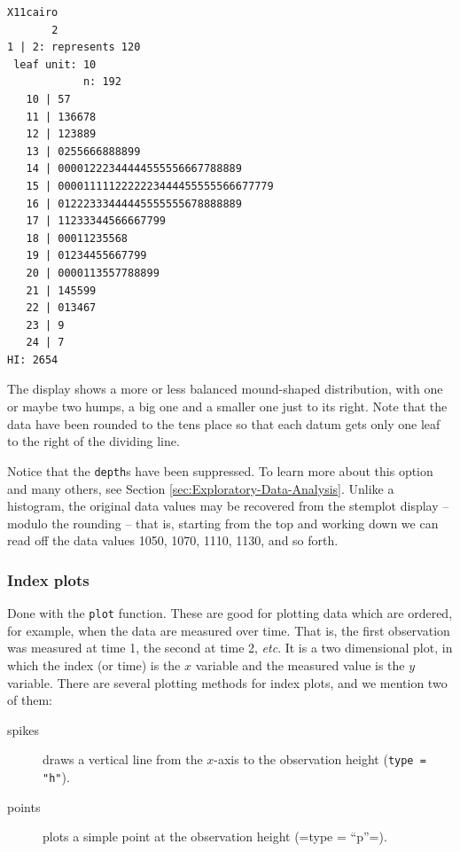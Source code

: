 \documentclass[captions=tableheading]{scrbook}
\begin{document}
\begin{verbatim}
X11cairo 
       2
1 | 2: represents 120
 leaf unit: 10
            n: 192
   10 | 57
   11 | 136678
   12 | 123889
   13 | 0255666888899
   14 | 00001222344444555556667788889
   15 | 0000111112222223444455555566677779
   16 | 01222333444445555555678888889
   17 | 11233344566667799
   18 | 00011235568
   19 | 01234455667799
   20 | 0000113557788899
   21 | 145599
   22 | 013467
   23 | 9
   24 | 7
HI: 2654
\end{verbatim}

The display shows a more or less balanced mound-shaped distribution, with one or maybe two humps, a big one and a smaller one just to its right. Note that the data have been rounded to the tens place so that each datum gets only one leaf to the right of the dividing line.

Notice that the \texttt{depth}s have been suppressed. To learn more about this option and many others, see Section \ref{sec:Exploratory-Data-Analysis}. Unlike a histogram, the original data values may be recovered from the stemplot display -- modulo the rounding -- that is, starting from the top and working down we can read off the data values 1050, 1070, 1110, 1130, and so forth. 
\subsubsection{Index plots}
\label{sec-2-1-2-4}


Done with the \texttt{plot} function. These are good for plotting data which are ordered, for example, when the data are measured over time. That is, the first observation was measured at time 1, the second at time 2, \emph{etc}. It is a two dimensional plot, in which the index (or time) is the \(x\) variable and the measured value is the \(y\) variable. There are several plotting methods for index plots, and we mention two of them:

\begin{description}
\item[spikes] draws a vertical line from the \(x\)-axis to the observation height (\texttt{type = "h"}).
\item[points] plots a simple point at the observation height (=type = ``p''=).
\end{description}
\end{document}
